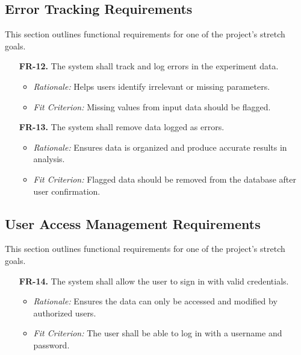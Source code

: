 \documentclass[12pt]{article}
\begin{document}
\subsection{Error Tracking Requirements}
This section outlines functional requirements for one of the project's stretch
goals.
\begin{enumerate}
  \item[\textbf{FR-12.}] The system shall track and log errors in the experiment
  data.
  \begin{itemize}
    \item \textit{Rationale:} Helps users identify irrelevant or missing
    parameters.
    \item \textit{Fit Criterion:} Missing values from input data should be
    flagged.
  \end{itemize}
  \item[\textbf{FR-13.}] The system shall remove data logged as errors.
  \begin{itemize}
    \item \textit{Rationale:} Ensures data is organized and produce accurate
    results in analysis.
    \item \textit{Fit Criterion:} Flagged data should be removed from the
    database after user confirmation.
  \end{itemize}
\end{enumerate}

\subsection{User Access Management Requirements}
This section outlines functional requirements for one of the project's stretch
goals.
\begin{enumerate}
  \item[\textbf{FR-14.}] The system shall allow the user to sign in with valid
  credentials.
  \begin{itemize}
    \item \textit{Rationale:} Ensures the data can only be accessed and modified
    by authorized users.
    \item \textit{Fit Criterion:} The user shall be able to log in with a
    username and password.
  \end{itemize}
\end{enumerate}
\end{document}
